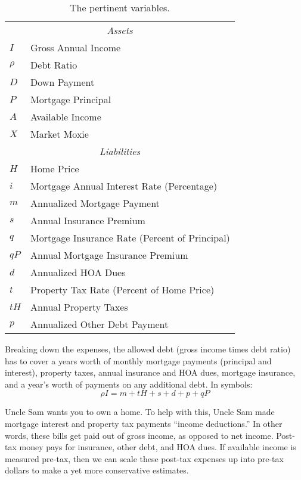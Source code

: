 \documentclass{article}
\begin{document}
\begin{table}
\begin{center}
\begin{tabular}{ll}
\hline
\hline
\multicolumn{2}{c}{\emph{Assets}} \\
$I$ & Gross Annual Income \\
$\rho$ & Debt Ratio \\
$D$ & Down Payment \\
$P$ & Mortgage Principal \\
$A$ & Available Income \\
$X$ & Market Moxie \\
\hline
\multicolumn{2}{c}{\emph{Liabilities}} \\
$H$ & Home Price \\
$i$ & Mortgage Annual Interest Rate (Percentage)\\
$m$ & Annualized Mortgage Payment \\
$s$ & Annual Insurance Premium \\
$q$ & Mortgage Insurance Rate (Percent of Principal)\\
$qP$ & Annual Mortgage Insurance Premium \\
$d$ & Annualized HOA Dues \\
$t$ & Property Tax Rate (Percent of Home Price) \\
$tH$ & Annual Property Taxes \\
$p$ & Annualized Other Debt Payment \\
\hline
\hline
\end{tabular}
\caption{The pertinent variables.}
\label{table:variables}
\end{center}
\end{table}

\pagebreak

Breaking down the expenses, the allowed
debt (gross income times debt ratio) has to cover 
a years worth of monthly mortgage payments (principal and interest),
 property taxes, 
annual insurance and HOA dues, mortgage insurance, and a year's
 worth of payments on 
any additional debt. In symbols:
\begin{equation}
\label{DebtRatio}
\rho I = m + tH + s + d + p + qP
\end{equation}

Uncle Sam wants you to own a home. To help with this, Uncle Sam 
made mortgage interest and property tax payments 
``income deductions.'' In other words, these bills get paid out 
of gross income, as opposed to net income. Post-tax money pays 
for insurance, other debt, and HOA dues. If available income is 
measured pre-tax, then we can scale these post-tax expenses up 
into pre-tax dollars to make a yet more conservative estimates.
\end{document}
